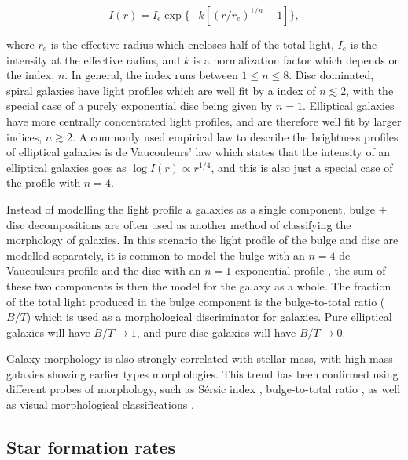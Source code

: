 \begin{equation}
  I(r) = I_e \exp \{-k [(r/r_e)^{1/n} - 1]\},
\end{equation}

\noindent
where $r_e$ is the effective radius which encloses half of the total
light, $I_e$ is the intensity at the effective radius, and $k$ is a
normalization factor which depends on the \ser index, $n$.  In
general, the \ser index runs between $1 \le n \le 8$.  Disc
dominated, spiral galaxies have light profiles which are well fit by a
\ser index of $n \lesssim 2$, with the special case of a purely
exponential disc being given by $n=1$.  Elliptical galaxies have more
centrally concentrated light profiles, and are therefore well fit by
larger \ser indices, $n \gtrsim 2$.  A commonly used empirical law to
describe the brightness profiles of elliptical galaxies is de
Vaucouleurs' law which states that the intensity of an elliptical
galaxies goes as $\log I(r) \propto r^{1/4}$, and this is also just a
special case of the \ser profile with $n=4$.
\par
Instead of modelling the light profile a galaxies as a single
component, bulge + disc decompositions are often used as another
method of classifying the morphology of galaxies.  In this scenario
the light profile of the bulge and disc are modelled separately, it is
common to model the bulge with an $n=4$ de Vaucouleurs profile and the
disc with an $n=1$ exponential profile \citep[e.g.][]{simard2002}, the
sum of these two
components is then the model for the galaxy as a whole.  The fraction
of the total light produced in the bulge component is the bulge-to-total ratio
($B/T$) which is used as a morphological discriminator for galaxies.
Pure elliptical galaxies will have $B/T \to 1$, and pure disc galaxies
will have $B/T \to 0$.
\par
Galaxy morphology is also strongly correlated with stellar mass, with
high-mass galaxies showing earlier types morphologies.  This trend has
been confirmed using different probes of morphology, such as
S{\'e}rsic index \citep{vanderwel2008}, bulge-to-total ratio
\citep{bluck2014}, as well as visual morphological classifications
\citep{bamford2009}.  

\subsection{Star formation rates}
\label{sec:sfr}


